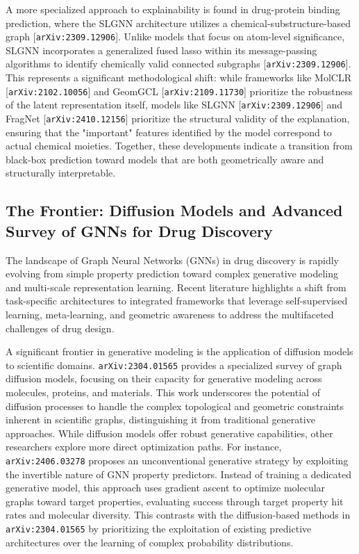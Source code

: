 \documentclass[11pt]{article}
\begin{document}
A more specialized approach to explainability is found in drug-protein binding prediction, where the SLGNN architecture utilizes a chemical-substructure-based graph [\texttt{arXiv:2309.12906}]. Unlike models that focus on atom-level significance, SLGNN incorporates a generalized fused lasso within its message-passing algorithms to identify chemically valid connected subgraphs [\texttt{arXiv:2309.12906}]. This represents a significant methodological shift: while frameworks like MolCLR [\texttt{arXiv:2102.10056}] and GeomGCL [\texttt{arXiv:2109.11730}] prioritize the robustness of the latent representation itself, models like SLGNN [\texttt{arXiv:2309.12906}] and FragNet [\texttt{arXiv:2410.12156}] prioritize the structural validity of the explanation, ensuring that the "important" features identified by the model correspond to actual chemical moieties. Together, these developments indicate a transition from black-box prediction toward models that are both geometrically aware and structurally interpretable.

\subsection{The Frontier: Diffusion Models and Advanced Survey of GNNs for Drug Discovery}

The landscape of Graph Neural Networks (GNNs) in drug discovery is rapidly evolving from simple property prediction toward complex generative modeling and multi-scale representation learning. Recent literature highlights a shift from task-specific architectures to integrated frameworks that leverage self-supervised learning, meta-learning, and geometric awareness to address the multifaceted challenges of drug design.

A significant frontier in generative modeling is the application of diffusion models to scientific domains. \texttt{arXiv:2304.01565} provides a specialized survey of graph diffusion models, focusing on their capacity for generative modeling across molecules, proteins, and materials. This work underscores the potential of diffusion processes to handle the complex topological and geometric constraints inherent in scientific graphs, distinguishing it from traditional generative approaches. While diffusion models offer robust generative capabilities, other researchers explore more direct optimization paths. For instance, \texttt{arXiv:2406.03278} proposes an unconventional generative strategy by exploiting the invertible nature of GNN property predictors. Instead of training a dedicated generative model, this approach uses gradient ascent to optimize molecular graphs toward target properties, evaluating success through target property hit rates and molecular diversity. This contrasts with the diffusion-based methods in \texttt{arXiv:2304.01565} by prioritizing the exploitation of existing predictive architectures over the learning of complex probability distributions.
\end{document}
